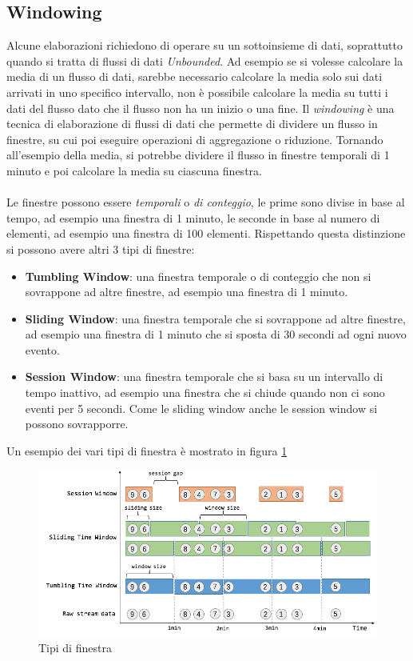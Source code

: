 \subsection{Windowing}
\label{subsec:flink_windowing}
Alcune elaborazioni richiedono di operare su un sottoinsieme di dati, soprattutto quando si tratta di flussi di dati \textit{Unbounded}.
Ad esempio se si volesse calcolare la media di un flusso di dati, sarebbe necessario calcolare la media solo sui dati arrivati in uno specifico intervallo, 
non è possibile calcolare la media su tutti i dati del flusso dato che il flusso non ha un inizio o una fine.
Il \textit{windowing} è una tecnica di elaborazione di flussi di dati che permette di dividere un flusso in finestre,
su cui poi eseguire operazioni di aggregazione o riduzione.
Tornando all'esempio della media, si potrebbe dividere il flusso in finestre temporali di 1 minuto e poi calcolare la media su ciascuna finestra.\\\\
Le finestre possono essere \textit{temporali} o \textit{di conteggio}, le prime sono divise in base al tempo, ad esempio una finestra di 1 minuto,
le seconde in base al numero di elementi, ad esempio una finestra di 100 elementi.
Rispettando questa distinzione si possono avere altri 3 tipi di finestre:
\begin{itemize}
    \item \textbf{Tumbling Window}: una finestra temporale o di conteggio che non si sovrappone ad altre finestre, ad esempio una finestra di 1 minuto.
    \item \textbf{Sliding Window}: una finestra temporale che si sovrappone ad altre finestre, ad esempio una finestra di 1 minuto che si sposta di 30 secondi ad ogni nuovo evento.
    \item \textbf{Session Window}: una finestra temporale che si basa su un intervallo di tempo inattivo, ad esempio una finestra che si chiude quando non ci sono eventi per 5 secondi.
    Come le sliding window anche le session window si possono sovrapporre.
\end{itemize}
Un esempio dei vari tipi di finestra è mostrato in figura \ref{fig:flink_window}

\begin{figure}[htbp]
    \centering
    \includegraphics[width=\textwidth]{images/flink/windows.png}
    \caption{Tipi di finestra}
    \label{fig:flink_window}
\end{figure}

